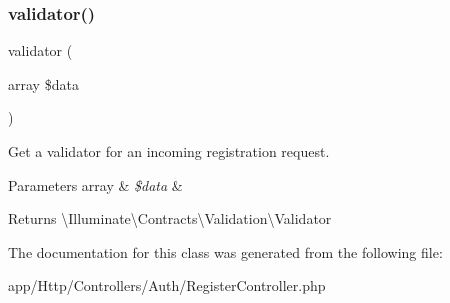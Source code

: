 \subsubsection{\texorpdfstring{validator()}{validator()}}
{\footnotesize\ttfamily validator (\begin{DoxyParamCaption}\item[{array}]{\$data }\end{DoxyParamCaption})\hspace{0.3cm}{\ttfamily [protected]}}

Get a validator for an incoming registration request.


\begin{DoxyParams}[1]{Parameters}
array & {\em \$data} & \\
\hline
\end{DoxyParams}
\begin{DoxyReturn}{Returns}
\textbackslash{}\+Illuminate\textbackslash{}\+Contracts\textbackslash{}\+Validation\textbackslash{}\+Validator 
\end{DoxyReturn}


The documentation for this class was generated from the following file\+:\begin{DoxyCompactItemize}
\item 
app/\+Http/\+Controllers/\+Auth/Register\+Controller.\+php\end{DoxyCompactItemize}
